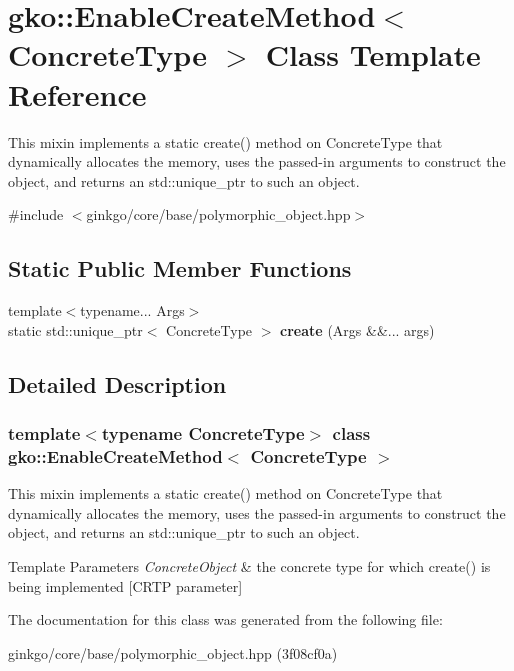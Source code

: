 \hypertarget{classgko_1_1EnableCreateMethod}{}\section{gko\+:\+:Enable\+Create\+Method$<$ Concrete\+Type $>$ Class Template Reference}
\label{classgko_1_1EnableCreateMethod}


This mixin implements a static {\ttfamily create()} method on {\ttfamily Concrete\+Type} that dynamically allocates the memory, uses the passed-\/in arguments to construct the object, and returns an std\+::unique\+\_\+ptr to such an object.  




{\ttfamily \#include $<$ginkgo/core/base/polymorphic\+\_\+object.\+hpp$>$}

\subsection*{Static Public Member Functions}
\begin{DoxyCompactItemize}
\item 
\mbox{\label{classgko_1_1EnableCreateMethod_aa732d4d8736a4ade9206b9641cd1edd5}} 
{\footnotesize template$<$typename... Args$>$ }\\static std\+::unique\+\_\+ptr$<$ Concrete\+Type $>$ {\bfseries create} (Args \&\&... args)
\end{DoxyCompactItemize}


\subsection{Detailed Description}
\subsubsection*{template$<$typename Concrete\+Type$>$\newline
class gko\+::\+Enable\+Create\+Method$<$ Concrete\+Type $>$}

This mixin implements a static {\ttfamily create()} method on {\ttfamily Concrete\+Type} that dynamically allocates the memory, uses the passed-\/in arguments to construct the object, and returns an std\+::unique\+\_\+ptr to such an object. 


\begin{DoxyTemplParams}{Template Parameters}
{\em Concrete\+Object} & the concrete type for which {\ttfamily create()} is being implemented \mbox{[}C\+R\+TP parameter\mbox{]} \\
\hline
\end{DoxyTemplParams}


The documentation for this class was generated from the following file\+:\begin{DoxyCompactItemize}
\item 
ginkgo/core/base/polymorphic\+\_\+object.\+hpp (3f08cf0a)\end{DoxyCompactItemize}
